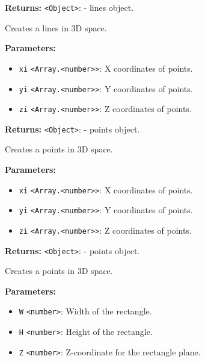 \documentclass[12pt,a4paper]{article}
\begin{document}
\noindent \textbf{Returns:} \texttt{<Object>}: - lines object.

\noindent Creates a lines in 3D space.

\vspace{5mm}
\noindent {}


\noindent \textbf{Parameters:}
\begin{itemize}
  \item \texttt{xi} \texttt{<Array.<number>>}: X coordinates of points.
  \item \texttt{yi} \texttt{<Array.<number>>}: Y coordinates of points.
  \item \texttt{zi} \texttt{<Array.<number>>}: Z coordinates of points.
\end{itemize}

\noindent \textbf{Returns:} \texttt{<Object>}: - points object.

\noindent Creates a points in 3D space.

\vspace{5mm}
\noindent {}


\noindent \textbf{Parameters:}
\begin{itemize}
  \item \texttt{xi} \texttt{<Array.<number>>}: X coordinates of points.
  \item \texttt{yi} \texttt{<Array.<number>>}: Y coordinates of points.
  \item \texttt{zi} \texttt{<Array.<number>>}: Z coordinates of points.
\end{itemize}

\noindent \textbf{Returns:} \texttt{<Object>}: - points object.

\noindent Creates a points in 3D space.

\vspace{5mm}
\noindent {}


\noindent \textbf{Parameters:}
\begin{itemize}
  \item \texttt{W} \texttt{<number>}: Width of the rectangle.
  \item \texttt{H} \texttt{<number>}: Height of the rectangle.
  \item \texttt{Z} \texttt{<number>}: Z-coordinate for the rectangle plane.
\end{itemize}
\end{document}
